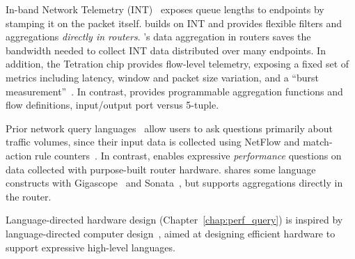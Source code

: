 
%

In-band Network Telemetry (INT)~\cite{int, tpp} exposes queue lengths to
endpoints by stamping it on the packet itself. \TheSystem builds on INT and
provides flexible filters and aggregations {\em directly in routers}.
\TheSystem's data aggregation in routers saves the bandwidth needed to collect
INT data distributed over many endpoints.  In addition, the Tetration chip
provides flow-level telemetry, exposing a fixed set of metrics including
latency, window and packet size variation, and a ``burst
measurement''~\cite{tetration-telemetry}. In contrast, \TheSystem provides
programmable aggregation functions and flow definitions, \eg input/output port versus 5-tuple.

 Prior network query languages~\cite{gigascope,
frenetic, path_query, streaming-monitoring} allow users to ask questions
primarily about traffic volumes, since their input data is
collected using NetFlow and match-action rule counters~\cite{openflow}. In
contrast, \TheSystem enables expressive {\em performance} questions on
data collected with purpose-built router hardware. \TheSystem shares some
language constructs with Gigascope~\cite{gigascope} and
Sonata~\cite{streaming-monitoring}, but supports aggregations directly in the
router.

 Language-directed hardware design (Chapter~\ref{chap:perf_query})
is inspired by language-directed computer design~\cite{language-directed-computer-design,
ditzel_patterson, soar}, aimed at designing efficient hardware to support
expressive high-level languages.

